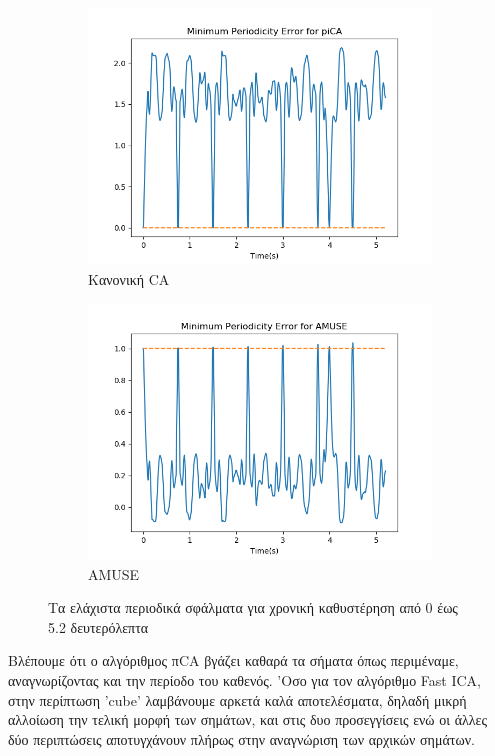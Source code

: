 \begin{figure}[H]
    \centering
    \begin{subfigure}[b]{0.48 \textwidth}
        \centering
       \includegraphics[width=\textwidth]{biosignals/aami_pica_error.png}\en
        \caption{\gr Κανονική \en \pi CA} \gr
        \label{fig:5.18a}
    \end{subfigure}
    \hfill
    \begin{subfigure}[b]{0.48 \textwidth}
        \centering
       \includegraphics[width=\textwidth]{biosignals/aami_amuse_error.png}
        \en
        \caption{AMUSE} \gr
        \label{fig:5.18b}
    \end{subfigure}
    \gr
    \caption{Τα ελάχιστα περιοδικά σφάλματα για χρονική καθυστέρηση από 0 έως 5.2 δευτερόλεπτα}
\end{figure}
\noindent Βλέπουμε ότι ο αλγόριθμος π\en CA \gr βγάζει καθαρά τα σήματα όπως περιμέναμε, αναγνωρίζοντας και την περίοδο του καθενός. 'Οσο για τον αλγόριθμο \en Fast ICA, \gr στην περίπτωση \en 'cube' \gr λαμβάνουμε αρκετά καλά αποτελέσματα, δηλαδή μικρή αλλοίωση την τελική μορφή των σημάτων, και στις δυο προσεγγίσεις ενώ οι άλλες δύο περιπτώσεις αποτυγχάνουν πλήρως στην αναγνώριση των αρχικών σημάτων.  
